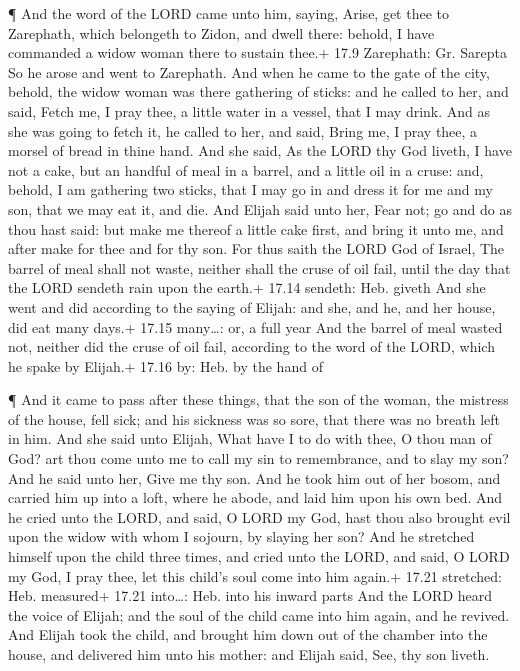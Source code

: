  ¶ And the word of the LORD came unto him, saying,
 Arise, get thee to Zarephath, which belongeth to Zidon, and
dwell there: behold, I have commanded a widow woman there to sustain
thee.+ 17.9 Zarephath: Gr. Sarepta  So he arose and went to
Zarephath. And when he came to the gate of the city, behold, the widow
woman was there gathering of sticks: and he called to her, and said,
Fetch me, I pray thee, a little water in a vessel, that I may drink.
 And as she was going to fetch it, he called to her, and
said, Bring me, I pray thee, a morsel of bread in thine hand.
 And she said, As the LORD thy God liveth, I have not a
cake, but an handful of meal in a barrel, and a little oil in a cruse:
and, behold, I am gathering two sticks, that I may go in and dress it
for me and my son, that we may eat it, and die.  And Elijah
said unto her, Fear not; go and do as thou hast said: but make me
thereof a little cake first, and bring it unto me, and after make for
thee and for thy son.  For thus saith the LORD God of
Israel, The barrel of meal shall not waste, neither shall the cruse of
oil fail, until the day that the LORD sendeth rain upon the earth.+
17.14 sendeth: Heb. giveth  And she went and did according
to the saying of Elijah: and she, and he, and her house, did eat many
days.+ 17.15 many\ldots: or, a full year  And the barrel of
meal wasted not, neither did the cruse of oil fail, according to the
word of the LORD, which he spake by Elijah.+ 17.16 by: Heb. by the hand
of

 ¶ And it came to pass after these things, that the son of
the woman, the mistress of the house, fell sick; and his sickness was so
sore, that there was no breath left in him.  And she said
unto Elijah, What have I to do with thee, O thou man of God? art thou
come unto me to call my sin to remembrance, and to slay my son?
 And he said unto her, Give me thy son. And he took him out
of her bosom, and carried him up into a loft, where he abode, and laid
him upon his own bed.  And he cried unto the LORD, and
said, O LORD my God, hast thou also brought evil upon the widow with
whom I sojourn, by slaying her son?  And he stretched
himself upon the child three times, and cried unto the LORD, and said, O
LORD my God, I pray thee, let this child's soul come into him again.+
17.21 stretched: Heb. measured+ 17.21 into\ldots: Heb. into his inward
parts  And the LORD heard the voice of Elijah; and the soul
of the child came into him again, and he revived.  And
Elijah took the child, and brought him down out of the chamber into the
house, and delivered him unto his mother: and Elijah said, See, thy son
liveth.


